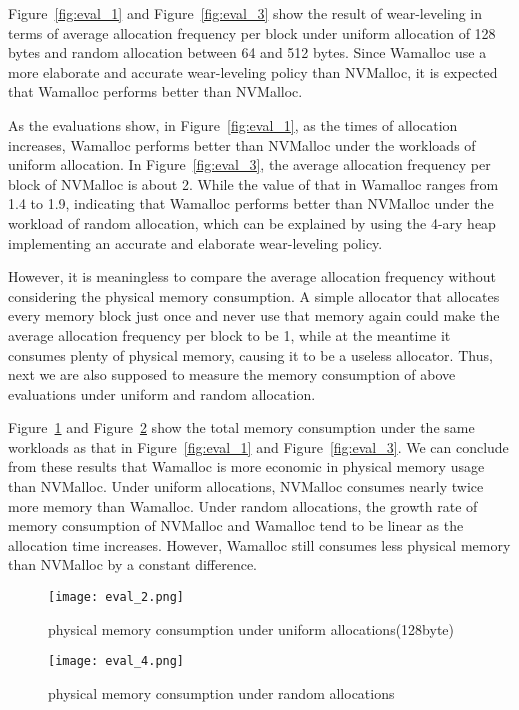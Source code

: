 \documentclass[10pt, conference, compsocconf]{IEEEtran}
\begin{document}
Figure~\ref{fig:eval_1} and Figure~\ref{fig:eval_3} show the result of wear-leveling 
in terms of average allocation frequency per block
under uniform allocation of 128 bytes and random allocation between 64 and 512 bytes.
Since Wamalloc use a more elaborate and accurate wear-leveling policy than NVMalloc,
it is expected that Wamalloc performs better than NVMalloc.

As the evaluations show, in Figure~\ref{fig:eval_1}, as the times of allocation increases,
Wamalloc performs better than NVMalloc under the workloads of uniform allocation.
In Figure~\ref{fig:eval_3},
the average allocation frequency per block of NVMalloc is about 2.
While the value of that in Wamalloc ranges from 1.4 to 1.9, 
indicating that Wamalloc performs better than NVMalloc under the workload of random allocation,
which can be explained by using the 4-ary heap implementing an accurate and elaborate wear-leveling policy.

However, it is meaningless to compare the average allocation frequency without considering the physical memory consumption.
A simple allocator that allocates every memory block just once and never use that memory again 
could make the average allocation frequency per block to be 1, 
while at the meantime it consumes plenty of physical memory, causing it to be a useless allocator.
Thus, next we are also supposed to measure the memory consumption of above evaluations under uniform and random allocation.

Figure~\ref{fig:eval_2} and Figure~\ref{fig:eval_4} show the total memory consumption under the same workloads 
as that in Figure~\ref{fig:eval_1} and Figure~\ref{fig:eval_3}.
We can conclude from these results that 
Wamalloc is more economic in physical memory usage than NVMalloc.
Under uniform allocations, NVMalloc consumes nearly twice more memory than Wamalloc.
Under random allocations, the growth rate of memory consumption of NVMalloc and Wamalloc tend to be linear 
as the allocation time increases. 
However, Wamalloc still consumes less physical memory than NVMalloc by a constant difference.

\begin{figure}[t]
\centering
\texttt{[image: eval\_2.png]}
\caption{physical memory consumption under uniform allocations(128byte)}
\label{fig:eval_2}
\end{figure}

\begin{figure}[t]
\centering
\texttt{[image: eval\_4.png]}
\caption{physical memory consumption under random allocations}
\label{fig:eval_4}
\end{figure}
\end{document}
